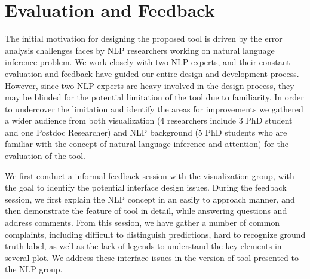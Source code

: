 \section{Evaluation and Feedback}

The initial motivation for designing the proposed tool is driven by the error analysis challenges faces by NLP researchers working on natural language inference problem. We work closely with two NLP experts, and their constant evaluation and feedback have guided our entire design and development process.
%
However, since two NLP experts are heavy involved in the design process, they may be blinded for the potential limitation of the tool due to familiarity.  In order to undercover the limitation and identify the areas for improvements we gathered a wider audience from both visualization (4 researchers include 3 PhD student and one Postdoc Researcher) and NLP background (5 PhD students who are familiar with the concept of natural language inference and attention) for the evaluation of the tool.  
%

We first conduct a informal feedback session with the visualization group, with the goal to identify the potential interface design issues. During the feedback session, we first explain the NLP concept in an easily to approach manner, and then demonstrate the feature of tool in detail, while answering questions and address comments.
%
From this session, we have gather a number of common complaints, including difficult to distinguish predictions, hard to recognize ground truth label, as well as the lack of legends to understand the key elements in several plot. We address these interface issues in the version of tool presented to the NLP group.

